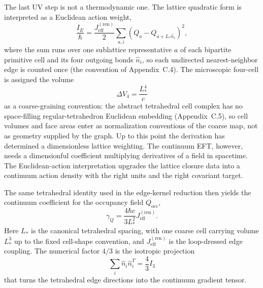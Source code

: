 \documentclass[11pt]{article}
\begin{document}
The last UV step is not a thermodynamic one. The lattice quadratic form is interpreted as a Euclidean action weight,
\[
\frac{I_E}{\hbar}
=
\frac{J_{\mathrm{eff}}^{(\mathrm{ren})}}{2}
\sum_{a,i}(Q_a-Q_{a+L_*\hat n_i})^2,
\]
where the sum runs over one sublattice representative $a$ of each bipartite primitive cell and its four outgoing bonds $\hat n_i$, so each undirected nearest-neighbor edge is counted once (the convention of Appendix~C.4). The microscopic four-cell is assigned the volume
\[
\Delta V_4=\frac{L_*^4}{c}
\]
as a coarse-graining convention: the abstract tetrahedral cell complex has no space-filling regular-tetrahedron Euclidean embedding (Appendix~C.5), so cell volumes and face areas enter as normalization conventions of the coarse map, not as geometry supplied by the graph.
Up to this point the derivation has determined a dimensionless lattice weighting. The continuum EFT, however, needs a dimensionful coefficient multiplying derivatives of a field in spacetime. The Euclidean-action interpretation upgrades the lattice closure data into a continuum action density with the right units and the right covariant target.

The same tetrahedral identity used in the edge-kernel reduction then yields the continuum coefficient for the occupancy field $Q_{\mathrm{occ}}$,
\[
\gamma_Q=\frac{4\hbar c}{3L_*^2}J_{\mathrm{eff}}^{(\mathrm{ren})}.
\]
Here $L_*$ is the canonical tetrahedral spacing, with one coarse cell carrying volume $L_*^3$ up to the fixed cell-shape convention, and $J_{\mathrm{eff}}^{(\mathrm{ren})}$ is the loop-dressed edge coupling. The numerical factor $4/3$ is the isotropic projection
\[
\sum_i \hat n_i\hat n_i^T=\frac43 I_3
\]
that turns the tetrahedral edge directions into the continuum gradient tensor.
\end{document}
